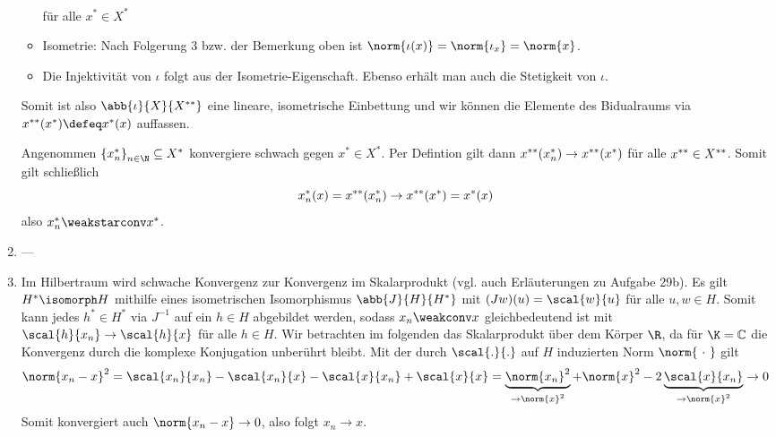 \begin{exercisePage}
\begin{enumerate}[label=(zu \alph*), leftmargin=*]
\begin{itemize}
\begin{equation*}
\begin{aligned}
 				\end{aligned}
 			\end{equation*} 
 			für alle $x^\ast \in X^\ast$
 			\item Isometrie: Nach Folgerung 3 bzw. der Bemerkung oben ist $\norm{\iota(x)} = \norm{\iota_x} = \norm{x}$.
 			\item Die Injektivität von $\iota$ folgt aus der Isometrie-Eigenschaft. Ebenso erhält man auch die Stetigkeit von $\iota$.
 		\end{itemize}
 		Somit ist also $\abb{\iota}{X}{X^\dast}$ eine lineare, isometrische Einbettung und wir können die Elemente des Bidualraums via $x^\dast(x^\ast) \defeq x^\ast(x)$ auffassen.
 		
 		Angenommen $\folge{x_n^\ast}{n \in \N} \subseteq X^\ast$ konvergiere schwach gegen $x^\ast \in X^\ast$. Per Defintion gilt dann $x^{\ast\ast}(x_n^\ast) \to x^{\ast\ast}(x^\ast)$ für alle $x^{\ast\ast} \in X^{\ast\ast}$. Somit gilt schließlich
 		\begin{equation*}
 			x_n^\ast(x) = x^{\ast\ast}(x_n^\ast) \to x^{\ast\ast}(x^\ast) = x^\ast(x)
 		\end{equation*}
 		also $x_n^\ast \weakstarconv x^\ast$.
 		\item ---
 		\item Im Hilbertraum wird schwache Konvergenz zur Konvergenz im Skalarprodukt (vgl. auch Erläuterungen zu Aufgabe 29b).
 		Es gilt $H^\ast \isomorph H$ mithilfe eines isometrischen Isomorphismus $\abb{J}{H}{H^\ast}$ mit $(Jw)(u) = \scal{w}{u}$ für alle $u,w \in H$. Somit kann jedes $h^\ast \in H^\ast$ via $J^{-1}$ auf ein $h \in H$ abgebildet werden, sodass $x_n \weakconv x$ gleichbedeutend ist mit $\scal{h}{x_n} \to \scal{h}{x}$ für alle $h \in H$. Wir betrachten im folgenden das Skalarprodukt über dem Körper $\R$, da für $\K= \mathbb{C}$ die Konvergenz durch die komplexe Konjugation unberührt bleibt. Mit der durch $\scal{.}{.}$ auf $H$ induzierten Norm $\norm{\ \cdot \ }$ gilt
 		\begin{equation*}
 			\norm{x_n - x}^2 
 			= \scal{x_n}{x_n} - \scal{x_n}{x} - \scal{x}{x_n} + \scal{x}{x} 
 			= \underbrace{\norm{x_n}^2}_{\to \norm{x}^2} + \norm{x}^2 - 2 \underbrace{\scal{x}{x_n}}_{\to \norm{x}^2} 
 			\to 0
 		\end{equation*}
 		Somit konvergiert auch $\norm{x_n - x} \to 0$, also folgt $x_n \to x$.
 	\end{enumerate}
\end{exercisePage}